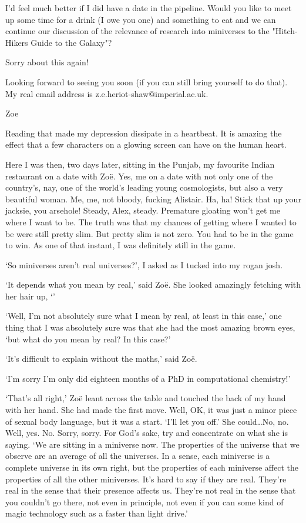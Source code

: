 I'd feel much better if I did have a date in the pipeline. Would you
like to meet up some time for a drink (I owe you one) and something to eat and we
can continue our discussion of the relevance of research into
miniverses to the "Hitch-Hikers Guide to the Galaxy"?

Sorry about this again!

Looking forward to seeing you soon (if you can still bring yourself to
do that). My real email address is z.e.heriot-shaw@imperial.ac.uk.

Zoe
\stopmessage

Reading that made my depression dissipate in a heartbeat. It is
amazing the effect that a few characters on a glowing screen can
have on the human heart.

Here I was then, two days later, sitting in the Punjab, my favourite
Indian restaurant on a date with Zoë. Yes, {\twelveit me\/} on
a date with not only one of the country's, nay, one of the
{\twelveit world's\/} leading young cosmologists, but also a very
beautiful woman. Me, {\twelveit me}, not bloody, fucking Alistair.
Ha, ha! Stick that up your jacksie, you arsehole! Steady, Alex,
steady. Premature gloating won't get me where I want to be. The
truth was that my chances of getting where I wanted to be were still
pretty slim. But pretty slim is not zero. You had to be in the game
to win. As one of that instant, I was definitely still in the game.

`So miniverses aren't real universes?', I asked as I tucked into my
rogan josh.

`It depends what you mean by real,' said Zoë. She looked
amazingly fetching with her hair up, `'

`Well, I'm not absolutely sure what {\twelveit I\/} mean by real, at
least in this case,' one thing that I was absolutely sure was that
she had the most amazing brown eyes, `but what do {\twelveit you\/}
mean by real? In this case?'

`It's difficult to explain without the maths,' said Zoë.

`I'm sorry I'm only did eighteen months of a PhD in computational
chemistry!'

`That's all right,' Zoë leant across the table and touched the
back of my hand with her hand. She had made the first move. Well,
OK, it was just a minor piece of sexual body language, but it was a
start. `I'll let you off.' She could\dots No, no. Well, yes. No.
Sorry, sorry. For God's sake, {\twelveit try\/} and concentrate on
what she is saying. `We are sitting in a miniverse now. The
properties of the universe that we observe are an average of all the
universes. In a sense, each miniverse is a complete universe in its
own right, but the properties of each miniverse affect the
properties of all the other miniverses. It's hard to say if they are
real. They're real in the sense that their presence affects us.
They're not real in the sense that you couldn't go there, not even
in principle, not even if you can some kind of magic technology such
as a faster than light drive.'

